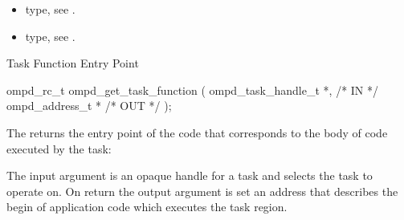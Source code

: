 \crossreferences
\begin{itemize}
	\item {} type, see .
	\item {} type, see .
\end{itemize}

%
%
%


\summary
Task Function Entry Point
\format
\cspecificstart
\begin{boxedcode}
ompd\_rc\_t ompd\_get\_task\_function (
  ompd\_task\_handle\_t *,                                 /* IN */
  ompd\_address\_t *                                 /* OUT */
);
\end{boxedcode}
\cspecificend

\descr
The  returns the entry point of the code
that corresponds to the body of code executed by the task:

\argdesc
The input argument  is an opaque handle for a task and selects the task to operate on.
On return the output argument  is set an address that describes the begin of application
code which executes the task region.

